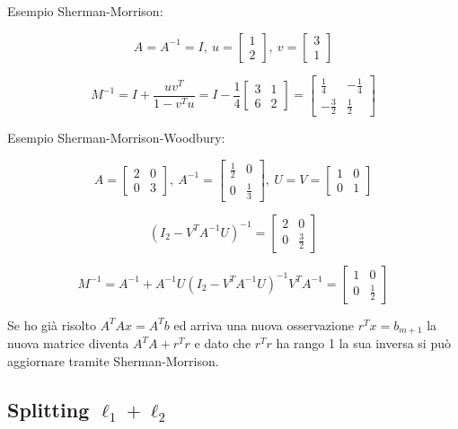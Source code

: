 \documentclass{article}
\begin{document}
Esempio Sherman-Morrison:

\[
A=A^{-1}=I,\ 
u=\begin{bmatrix}1\\2\end{bmatrix},
\
v=\begin{bmatrix}3\\1\end{bmatrix}
\]

\[
M^{-1}
=
I+\frac{uv^T}{1-v^Tu}
=
I-\frac14
\begin{bmatrix}
3&1\\
6&2
\end{bmatrix}
=
\begin{bmatrix}
\frac14 &-\frac14\\
-\frac32&\frac12
\end{bmatrix}
\]

\vspace{8pt}

Esempio Sherman-Morrison-Woodbury:

\[
A=
\begin{bmatrix}
2&0\\
0&3
\end{bmatrix},\
A^{-1}=
\begin{bmatrix}
\frac12&0\\
0&\frac13
\end{bmatrix},
\
U=V=
\begin{bmatrix}
1&0\\
0&1
\end{bmatrix}
\]

\[
(I_2-V^TA^{-1}U)^{-1}
=
\begin{bmatrix}
2&0\\
0&\frac32
\end{bmatrix}
\]

\[
M^{-1}
=
A^{-1}
+
A^{-1}U
(I_2-V^TA^{-1}U)^{-1}
V^TA^{-1}
=
\begin{bmatrix}
1&0\\
0&\frac12
\end{bmatrix}
\]\newline

Se ho già risolto $A^TAx=A^Tb$ ed arriva una nuova osservazione $r^Tx=b_{m+1}$ la nuova matrice diventa $A^TA+r^Tr$ e dato che $r^Tr$ ha rango 1 la sua inversa si può aggiornare tramite Sherman-Morrison. 


\subsection{\texorpdfstring{Splitting \(\ell_1+\ell_2\)}{split l1 + l2}}
\end{document}
